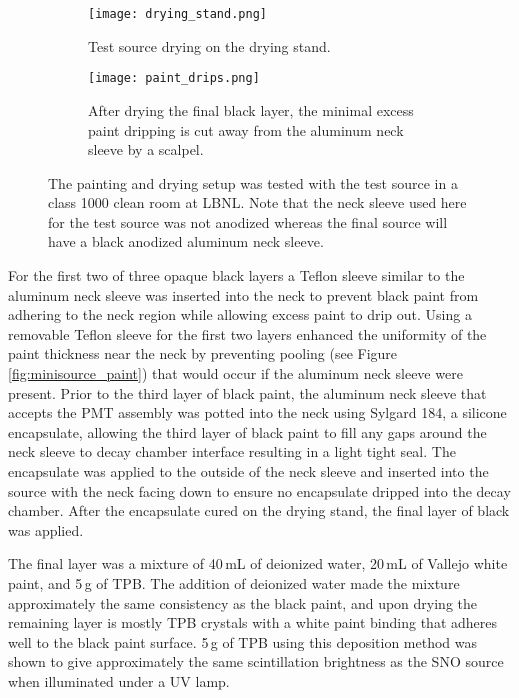 \begin{figure}
\begin{subfigure}{.28\textwidth}
  \texttt{[image: drying\_stand.png]}
  \caption{Test source drying on the drying stand.}
\end{subfigure}
\hspace{0.5cm}
\begin{subfigure}{.67\textwidth}
  \texttt{[image: paint\_drips.png]}
  \caption{After drying the final black layer, the minimal excess paint dripping is cut away from the aluminum neck sleeve by a scalpel.}
\end{subfigure}
\caption{The painting and drying setup was tested with the test source in a class 1000 clean room at LBNL. Note that the neck sleeve used here for the test source was not anodized whereas the final source will have a black anodized aluminum neck sleeve.}
\label{fig:drying}
\end{figure}


For the first two of three opaque black layers a Teflon sleeve similar to the aluminum neck sleeve was inserted into the neck to prevent black paint from adhering to the neck region while allowing excess paint to drip out. Using a removable Teflon sleeve for the first two layers enhanced the uniformity of the paint thickness near the neck by preventing pooling (see Figure \ref{fig:minisource_paint}) that would occur if the aluminum neck sleeve were present. Prior to the third layer of black paint, the aluminum neck sleeve that accepts the PMT assembly was potted into the neck using Sylgard 184, a silicone encapsulate, allowing the third layer of black paint to fill any gaps around the neck sleeve to decay chamber interface resulting in a light tight seal. The encapsulate was applied to the outside of the neck sleeve and inserted into the source with the neck facing down to ensure no encapsulate dripped into the decay chamber. After the encapsulate cured on the drying stand, the final layer of black was applied.

The final layer was a mixture of 40\,mL of deionized water, 20\,mL of Vallejo white paint, and 5\,g of TPB. The addition of deionized water made the mixture approximately the same consistency as the black paint, and upon drying the remaining layer is mostly TPB crystals with a white paint binding that adheres well to the black paint surface. 5\,g of TPB using this deposition method was shown to give approximately the same scintillation brightness as the SNO \Li source when illuminated under a UV lamp.

